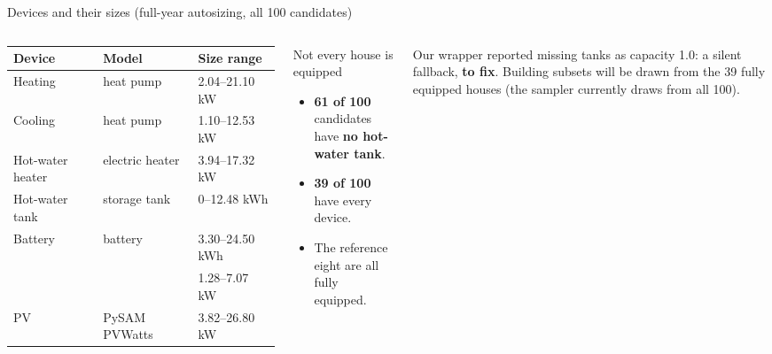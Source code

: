 \documentclass[aspectratio=169,10pt]{beamer}
\newcommand{\tagtodo}{\textcolor{stemsred}{\textbf{to fix}}}
\begin{document}
\begin{frame}{Devices and their sizes (full-year autosizing, all 100 candidates)}
\begin{columns}[T]
\footnotesize
\begin{tabular}{@{}lll@{}}
\toprule
Device & Model & Size range \\
\midrule
Heating & heat pump & 2.04--21.10 kW \\
Cooling & heat pump & 1.10--12.53 kW \\
Hot-water heater & electric heater & 3.94--17.32 kW \\
Hot-water tank & storage tank & 0--12.48 kWh \\
Battery & battery & 3.30--24.50 kWh \\
 & & 1.28--7.07 kW \\
PV & PySAM PVWatts & 3.82--26.80 kW \\
\bottomrule
\end{tabular}
\begin{alertblock}{Not every house is equipped}
\begin{itemize}
  \item \textbf{61 of 100} candidates have \textbf{no hot-water tank}.
  \item \textbf{39 of 100} have every device.
  \item The reference eight are all fully equipped.
\end{itemize}
\end{alertblock}
\small Our wrapper reported missing tanks as capacity 1.0: a silent fallback, \tagtodo. Building subsets will be drawn from the 39 fully equipped houses (the sampler currently draws from all 100).
\end{columns}
\end{frame}
\end{document}
